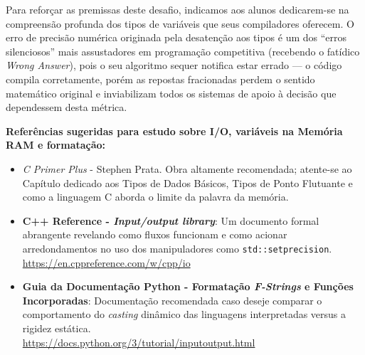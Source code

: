 \documentclass[11pt]{article}
\begin{document}
Para reforçar as premissas deste desafio, indicamos aos alunos dedicarem-se na compreensão profunda dos tipos de variáveis que seus compiladores oferecem. O erro de precisão numérica originada pela desatenção aos tipos é um dos ``erros silenciosos'' mais assustadores em programação competitiva (recebendo o fatídico \textit{Wrong Answer}), pois o seu algoritmo sequer notifica estar errado — o código compila corretamente, porém as repostas fracionadas perdem o sentido matemático original e inviabilizam todos os sistemas de apoio à decisão que dependessem desta métrica.

\vspace{0.5cm}

\begin{notebox}
\textbf{Referências sugeridas para estudo sobre I/O, variáveis na Memória RAM e formatação:}
\begin{itemize}
    \item \textit{C Primer Plus} - Stephen Prata. Obra altamente recomendada; atente-se ao Capítulo dedicado aos Tipos de Dados Básicos, Tipos de Ponto Flutuante e como a linguagem C aborda o limite da palavra da memória.
    \item \textbf{C++ Reference - \textit{Input/output library}}: Um documento formal abrangente revelando como fluxos funcionam e como acionar arredondamentos no uso dos manipuladores como \texttt{std::setprecision}. \\ \url{https://en.cppreference.com/w/cpp/io}
    \item \textbf{Guia da Documentação Python - Formatação \textit{F-Strings} e Funções Incorporadas}: Documentação recomendada caso deseje comparar o comportamento do \textit{casting} dinâmico das linguagens interpretadas versus a rigidez estática. \\ \url{https://docs.python.org/3/tutorial/inputoutput.html}
\end{itemize}
\end{notebox}

\vspace{2cm}

\end{document}
